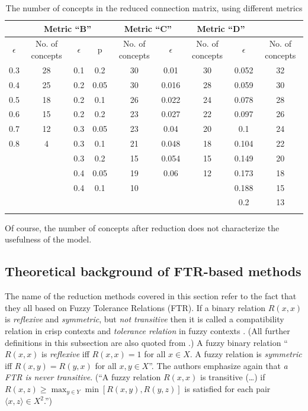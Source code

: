 \documentclass[graybox]{svmult}
\begin{document}
\begin{table}[!t]
\caption{The number of concepts in the reduced connection matrix, using different 
metrics \cite{hatwagnerm.f.koczyl.t.2015}}
\label{tab:reductionResults}
\centering
\begin{tabular}{ccccccccc}
\hline\noalign{\smallskip}
\multicolumn{2}{c}{Metric ``A''} &
  \multicolumn{3}{c}{Metric ``B''} &
  \multicolumn{2}{c}{Metric ``C''} &
  \multicolumn{2}{c}{Metric ``D''} \\
\hline\noalign{\smallskip}
$\epsilon$ & No. of concepts &
  $\epsilon$ & p & No. of concepts &
  $\epsilon$ & No. of concepts &
  $\epsilon$ & No. of concepts \\
\noalign{\smallskip}\svhline\noalign{\smallskip}
0.3 & 28 &
  0.1 & 0.2 & 30 &
  0.01 & 30 &
  0.052 & 32 \\
0.4 & 25 &
  0.2 & 0.05 & 30 &
  0.016 & 28 &
  0.059 & 30 \\
0.5 & 18 &
  0.2 & 0.1 & 26 &
  0.022 & 24 &
  0.078 & 28 \\
0.6 & 15 &
  0.2 & 0.2 & 23 &
  0.027 & 22 &
  0.097 & 26 \\
0.7 & 12 &
  0.3 & 0.05 & 23 &
  0.04 & 20 &
  0.1 & 24 \\
0.8 & 4 &
  0.3 & 0.1 & 21 &
  0.048 & 18 &
  0.104 & 22 \\
\multicolumn{2}{c}{} & 
  0.3 & 0.2 & 15 &
  0.054 & 15 &
  0.149 & 20 \\
\multicolumn{2}{c}{} & 
  0.4 & 0.05 & 19 &
  0.06 & 12 &
  0.173 & 18 \\
\multicolumn{2}{c}{} & 
  0.4 & 0.1 & 10 &
  \multicolumn{2}{c}{} &
  0.188 & 15 \\
\multicolumn{2}{c}{} &
  \multicolumn{3}{c}{} &
  \multicolumn{2}{c}{} &
  0.2 & 13 \\
\noalign{\smallskip}\hline\noalign{\smallskip}
\end{tabular}
\end{table}

Of course, the number of concepts after reduction does not characterize 
the usefulness of the model. 

\subsection{Theoretical background of FTR-based methods}
\label{sec:theoryFTR}

The name of the reduction methods covered in this section refer to the 
fact that they all based on Fuzzy Tolerance Relations (FTR). If a 
binary relation $R(x,x)$ is \emph{reflexive} and \emph{symmetric}, but 
\emph{not transitive} then it is called a compatibility relation in 
crisp contexts and \emph{tolerance relation} in fuzzy contexts 
\cite{klirg.j.yuanb.1995}. (All further definitions in this subsection 
are also quoted from \cite{klirg.j.yuanb.1995}.) A fuzzy binary 
relation ``$R(x,x)$ is \emph{reflexive} iff $R(x,x) = 1$ for all $x\in 
X$. A fuzzy relation is \emph{symmetric} iff $R(x,y)=R(y,x)$ for all 
$x,y\in X$''. The authors emphasize again that \emph{a FTR is never 
transitive}. (``A fuzzy relation $R(x,x)$ is transitive (\dots) if 
$R(x,z)\geq \max_{y\in Y}\min[R(x,y), R(y,z)]$ is satisfied for each 
pair $\langle x,z\rangle\in X^2$.'')
\end{document}
